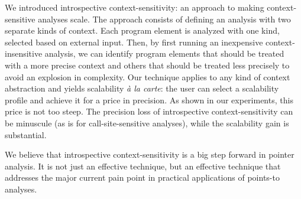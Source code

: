 We introduced introspective context-sensitivity: an approach to making context-sensitive analyses scale. The approach consists of defining an analysis with two separate kinds of context. Each program element is analyzed with one kind, selected based on external input. Then, by first running an inexpensive context-insensitive analysis, we can identify program elements that should be treated with a more precise context and others that should be treated less precisely to avoid an explosion in complexity. Our technique applies to any kind of context abstraction and yields scalability \emph{\`{a} la carte}: the user can select a scalability profile and achieve it for a price in precision. As shown in our experiments, this price is not too steep. The precision loss of introspective context-sensitivity can be minuscule (as is for call-site-sensitive analyses), while the scalability gain is substantial.

We believe that introspective context-sensitivity is a big step forward in pointer analysis. It is not just an effective technique, but an effective technique that addresses the major current pain point in practical applications of points-to analyses.